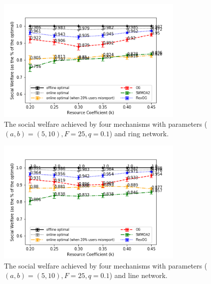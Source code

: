\documentclass[11pt]{phdthesis}
\begin{document}
\begin{figure}[h]
    \centering
    \includegraphics[width=0.8\textwidth]{./Figures/comparison of social welfare (resource-coefficient) (ring).png}
    \caption{The social welfare achieved by four mechanisms with parameters ($ (a, b) = (5, 10), F = 25, q = 0.1 $) and ring network.}
    \label{fig: social_welfare_resource_coefficient_ring} 
\end{figure}

\begin{figure}[h]
    \centering
    \includegraphics[width=0.8\textwidth]{./Figures/comparison of social welfare (resource-coefficient) (line).png}
    \caption{The social welfare achieved by four mechanisms with parameters ($ (a, b) = (5, 10), F = 25, q = 0.1 $) and line network.}
    \label{fig: social_welfare_resource_coefficient_line} 
\end{figure}
\end{document}
